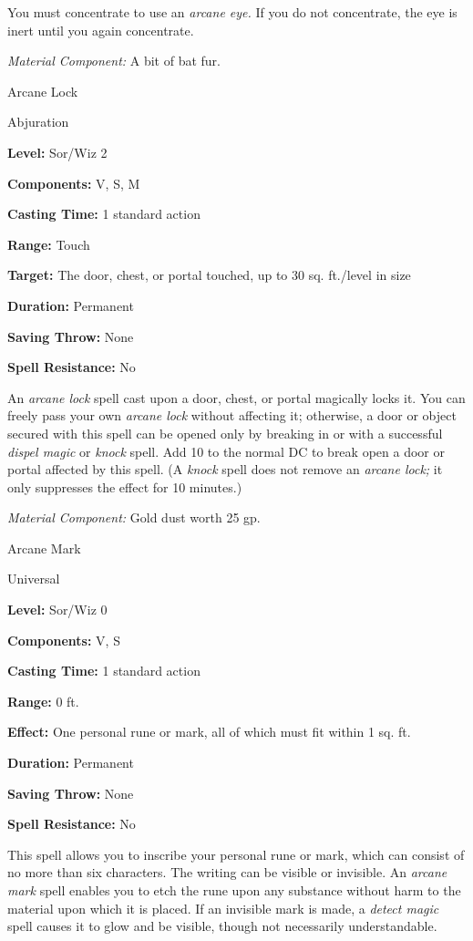 \documentclass{article}
\begin{document}
You must concentrate to use an \textit{arcane eye. }If you do not concentrate, 
the eye is inert until you again concentrate.

\textit{Material Component: }A bit of bat fur.

\vspace{12pt}
Arcane Lock

Abjuration

\textbf{Level:} Sor/Wiz 2

\textbf{Components:} V, S, M

\textbf{Casting Time:} 1 standard action

\textbf{Range:} Touch

\textbf{Target:} The door, chest, or portal touched, up to 30 sq. ft./level in 
size

\textbf{Duration:} Permanent

\textbf{Saving Throw:} None

\textbf{Spell Resistance:} No

An \textit{arcane lock }spell cast upon a door, chest, or portal magically locks 
it. You can freely pass your own \textit{arcane lock }without affecting it; otherwise, 
a door or object secured with this spell can be opened only by breaking in or with 
a successful \textit{dispel magic }or \textit{knock }spell. Add 10 to the normal 
DC to break open a door or portal affected by this spell. (A \textit{knock }spell 
does not remove an \textit{arcane lock; }it only suppresses the effect for 10 minutes.)

\textit{Material Component: }Gold dust worth 25 gp.

\vspace{12pt}
Arcane Mark

Universal

\textbf{Level:} Sor/Wiz 0

\textbf{Components:} V, S

\textbf{Casting Time:} 1 standard action

\textbf{Range:} 0 ft.

\textbf{Effect:} One personal rune or mark, all of which must fit within 1 sq. 
ft.

\textbf{Duration:} Permanent

\textbf{Saving Throw:} None

\textbf{Spell Resistance:} No

This spell allows you to inscribe your personal rune or mark, which can consist 
of no more than six characters. The writing can be visible or invisible. An \textit{arcane 
mark }spell enables you to etch the rune upon any substance without harm to the 
material upon which it is placed. If an invisible mark is made, a \textit{detect 
magic }spell causes it to glow and be visible, though not necessarily understandable.
\end{document}
